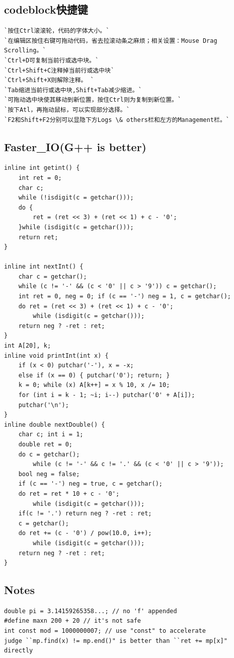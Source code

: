 \documentclass[a4paper]{article}
\begin{document}
\begin{CJK*}{UTF8}{gbsn}
\begin{multicols}{3}
\begin{flushleft}
\subsection{codeblock快捷键}
\begin{lstlisting}
`按住Ctrl滚滚轮，代码的字体大小。`
`在编辑区按住右键可拖动代码，省去拉滚动条之麻烦；相关设置：Mouse Drag Scrolling。` 
`Ctrl+D可复制当前行或选中块。`
`Ctrl+Shift+C注释掉当前行或选中块`
`Ctrl+Shift+X则解除注释。 `
`Tab缩进当前行或选中块,Shift+Tab减少缩进。`
`可拖动选中块使其移动到新位置，按住Ctrl则为复制到新位置。`
`按下Atl，再拖动鼠标，可以实现部分选择。`
`F2和Shift+F2分别可以显隐下方Logs \& others栏和左方的Management栏。`
\end{lstlisting}

\subsection{Faster\_IO(G++ is better)}
\begin{lstlisting}
inline int getint() {
	int ret = 0;
	char c;
	while (!isdigit(c = getchar()));
	do {
		ret = (ret << 3) + (ret << 1) + c - '0';	
	}while (isdigit(c = getchar()));
	return ret;
}

inline int nextInt() {
	char c = getchar();
	while (c != '-' && (c < '0' || c > '9')) c = getchar();
	int ret = 0, neg = 0; if (c == '-') neg = 1, c = getchar();
	do ret = (ret << 3) + (ret << 1) + c - '0';
		while (isdigit(c = getchar()));
	return neg ? -ret : ret;
}
int A[20], k;
inline void printInt(int x) {
	if (x < 0) putchar('-'), x = -x;
	else if (x == 0) { putchar('0'); return; }
	k = 0; while (x) A[k++] = x % 10, x /= 10;
	for (int i = k - 1; ~i; i--) putchar('0' + A[i]);
	putchar('\n');
}
inline double nextDouble() {
    char c; int i = 1;
    double ret = 0;
    do c = getchar();
   		while (c != '-' && c != '.' && (c < '0' || c > '9'));
    bool neg = false;
    if (c == '-') neg = true, c = getchar();
	do ret = ret * 10 + c - '0';
   		while (isdigit(c = getchar()));
    if(c != '.') return neg ? -ret : ret;
    c = getchar();
    do ret += (c - '0') / pow(10.0, i++);
		while (isdigit(c = getchar()));
    return neg ? -ret : ret;
}
\end{lstlisting}


\subsection{Notes}
\begin{lstlisting}
double pi = 3.14159265358...; // no 'f' appended
#define maxn 200 + 20 // it's not safe
int const mod = 1000000007; // use "const" to accelerate
judge ``mp.find(x) != mp.end()" is better than ``ret += mp[x]" directly


\end{lstlisting}
\end{flushleft}
\end{multicols}
\end{CJK*}
\end{document}
